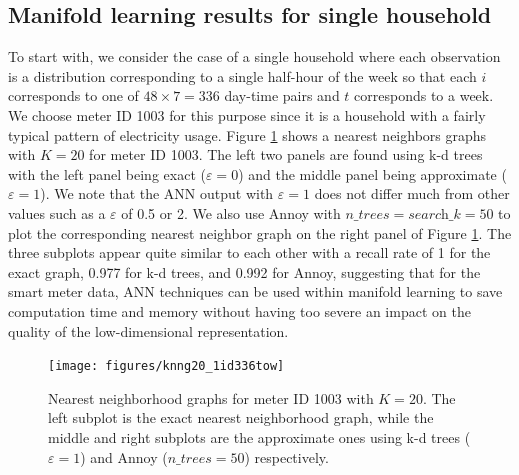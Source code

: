 \documentclass[12pt]{article}
\begin{document}
\hypertarget{electricityresults}{%
\subsection{Manifold learning results for single household}\label{electricityresults}}

To start with, we consider the case of a single household where each observation is a distribution corresponding to a single half-hour of the week so that each \(i\) corresponds to one of \(48 \times 7 = 336\) day-time pairs and \(t\) corresponds to a week. We choose meter ID 1003 for this purpose since it is a household with a fairly typical pattern of electricity usage. Figure \ref{fig:neighborplot} shows a nearest neighbors graphs with \(K=20\) for meter ID 1003. The left two panels are found using k-d trees with the left panel being exact (\(\varepsilon = 0\)) and the middle panel being approximate (\(\varepsilon = 1\)).
We note that the ANN output with \(\varepsilon = 1\) does not differ much from other values such as a \(\varepsilon\) of 0.5 or 2. We also use Annoy with \(\textit{n\_trees}=\textit{search\_k}=50\) to plot the corresponding nearest neighbor graph on the right panel of Figure \ref{fig:neighborplot}.
The three subplots appear quite similar to each other with a recall rate of 1 for the exact graph, 0.977 for k-d trees, and 0.992 for Annoy, suggesting that for the smart meter data, ANN techniques can be used within manifold learning to save computation time and memory without having too severe an impact on the quality of the low-dimensional representation.

\begin{figure}

{\centering \texttt{[image: figures/knng20\_1id336tow]} 

}

\caption{Nearest neighborhood graphs for meter ID 1003 with $K=20$. The left subplot is the exact nearest neighborhood graph, while the middle and right subplots are the approximate ones using k-d trees ($\varepsilon = 1$) and Annoy ($\textit{n\_trees}=50$) respectively.}\label{fig:neighborplot}
\end{figure}
\end{document}
